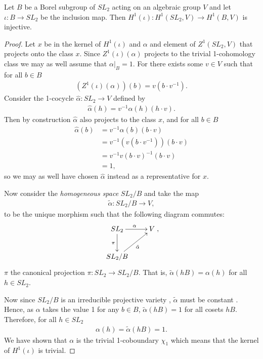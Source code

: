 \begin{lemma} Let $B$ be a Borel subgroup of $SL_2$ acting on an algebraic group $V$ and let $\iota : B \rightarrow SL_2$ be the inclusion map. Then $H^1(\iota):H^1(SL_2, V)\rightarrow H^1(B, V)$ is injective.
  \label{lem:sl2_b_inj}
\end{lemma}
\begin{proof}
Let $x$ be in the kernel of $H^1(\iota)$ and $\alpha$ and element of $Z^1(SL_2, V)$ that projects onto the class $x$. Since $Z^1(\iota)(\alpha)$ projects to the trivial 1-cohomology class we may as well assume that $\alpha|_B = 1$. For there exists some $v \in V$ such that for all $b \in B$
\begin{align}
	\left(Z^1(\iota)(\alpha) \right)(b) = v (b \cdot v^{-1}).
\end{align}
Consider the 1-cocycle $\hat{\alpha}:SL_2\rightarrow V$ defined by
\begin{align}
	\hat{\alpha}(h) = v^{-1} \alpha(h) (h \cdot v).
\end{align}
Then by construction $\hat{\alpha}$ also projects to the class $x$, and for all $b \in B$
\begin{align*}
	\hat{\alpha}(b) &=  v^{-1} \alpha(b) (b \cdot v) \\
	&=  v^{-1} (v (b\cdot v^{-1})) (b \cdot v)\\
	&=  v^{-1} v (b\cdot v)^{-1} (b \cdot v)\\
	&=  1,
\end{align*}
so we may as well have chosen $\hat{\alpha}$ instead as a representative for $x$. 

Now consider the \emph{homogeneous space} $SL_2/B$ and take the map 
\begin{align}
	\tilde{\alpha}:SL_2/B \rightarrow V,
\end{align}
to be the unique morphism such that the following diagram commutes:
\begin{align}
	\xymatrix{
	SL_2 \ar[r]^{\alpha} \ar[d]_{\pi} & V\\
	SL_2/B \ar[ru]_{\tilde{\alpha}}
	},
\end{align}
$\pi$ the canonical projection $\pi:SL_2 \rightarrow SL_2/B$. That is, $\tilde{\alpha}(hB) = \alpha(h)$ for all $h \in SL_2$.

Now since $SL_2/B$ is an irreducible projective variety \cite[Theorem 21.3]{humphreys1975linear}, $\tilde{\alpha}$ must be constant  \cite{borel1991linear}. Hence, as $\alpha$ takes the value 1 for any $b \in B$, $\tilde{\alpha}(hB) = 1$ for all cosets $hB$. Therefore, for all $h \in SL_2$
\begin{align}
	\alpha(h) = \tilde{\alpha}(hB) = 1.
\end{align}
We have shown that $\alpha$ is the trivial 1-coboundary $\chi_1$ which means that the kernel of $H^1(\iota)$ is trivial.
\end{proof} 


